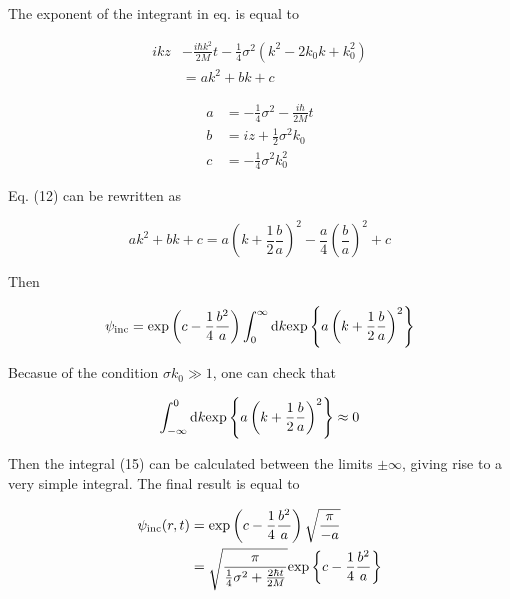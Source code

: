 \indent The exponent of the integrant in eq. is equal to

\begin{equation}
\begin{split}
ikz &- \frac{i\hbar k^2}{2M} t - \frac{1}{4} \sigma^2 (k^2 -2k_0k +k_0^2) \\
&= a k^2 + b k + c
\end{split}
\end{equation}

\begin{equation}
\begin{split}
a &= -\frac{1}{4} \sigma^2 - \frac{i \hbar}{2M} t \\
b &= iz + \frac{1}{2} \sigma^2 k_0 \\
c &= - \frac{1}{4} \sigma^2 k_0^2
\end{split}
\end{equation}

\noindent Eq. (12) can be rewritten as

\begin{equation}
\nonumber
a k^2 + bk + c = a \left( k + \frac{1}{2}\frac{b}{a} \right)^2 - \frac{a}{4} \left( \frac{b}{a} \right)^2 + c
\end{equation}

\noindent Then

\begin{equation}
\psi_{\rm inc} = {\rm exp} \left( c - \frac{1}{4} \frac{b^2}{a} \right) \int_0^{\infty} {\rm d}k {\rm exp} \left\{ a \left( k + \frac{1}{2} \frac{b}{a} \right)^2 \right\}
\end{equation}

\noindent Becasue of the condition $\sigma k_0 \gg 1$, one can check that

\begin{equation}
\int_{-\infty}^0 {\rm d}k {\rm exp} \left\{ a \left( k + \frac{1}{2} \frac{b}{a} \right)^2 \right\} \approx 0
\end{equation}

\noindent Then the integral (15) can be calculated between the limits $\pm \infty$, giving rise to a very simple integral. The final result is equal to

\begin{equation}
\begin{split}
\psi_{\rm inc}(r,t) &= {\rm exp}\left( c - \frac{1}{4} \frac{b^2}{a} \right) \sqrt{\frac{\pi}{-a}} \\
&= \sqrt{\frac{\pi}{\frac{1}{4} \sigma^2 + \frac{2 \hbar t}{2M}}} {\rm exp} \left\{ c - \frac{1}{4} \frac{b^2}{a} \right\}
\end{split}
\end{equation}

